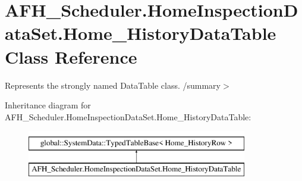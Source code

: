 \section{A\+F\+H\+\_\+\+Scheduler.\+Home\+Inspection\+Data\+Set.\+Home\+\_\+\+History\+Data\+Table Class Reference}
\label{class_a_f_h___scheduler_1_1_home_inspection_data_set_1_1_home___history_data_table}


Represents the strongly named Data\+Table class. /summary$>$  


Inheritance diagram for A\+F\+H\+\_\+\+Scheduler.\+Home\+Inspection\+Data\+Set.\+Home\+\_\+\+History\+Data\+Table\+:\begin{figure}[H]
\begin{center}
\leavevmode
\includegraphics[height=2.000000cm]{class_a_f_h___scheduler_1_1_home_inspection_data_set_1_1_home___history_data_table}
\end{center}
\end{figure}
